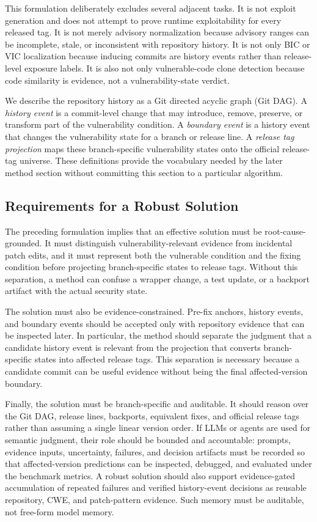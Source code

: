 This formulation deliberately excludes several adjacent tasks. It is not exploit generation and does not attempt to prove runtime exploitability for every released tag. It is not merely advisory normalization because advisory ranges can be incomplete, stale, or inconsistent with repository history. It is not only BIC or VIC localization because inducing commits are history events rather than release-level exposure labels. It is also not only vulnerable-code clone detection because code similarity is evidence, not a vulnerability-state verdict.

We describe the repository history as a Git directed acyclic graph (Git DAG). A \emph{history event} is a commit-level change that may introduce, remove, preserve, or transform part of the vulnerability condition. A \emph{boundary event} is a history event that changes the vulnerability state for a branch or release line. A \emph{release tag projection} maps these branch-specific vulnerability states onto the official release-tag universe. These definitions provide the vocabulary needed by the later method section without committing this section to a particular algorithm.

\subsection{Requirements for a Robust Solution}

The preceding formulation implies that an effective solution must be root-cause-grounded. It must distinguish vulnerability-relevant evidence from incidental patch edits, and it must represent both the vulnerable condition and the fixing condition before projecting branch-specific states to release tags. Without this separation, a method can confuse a wrapper change, a test update, or a backport artifact with the actual security state.

The solution must also be evidence-constrained. Pre-fix anchors, history events, and boundary events should be accepted only with repository evidence that can be inspected later. In particular, the method should separate the judgment that a candidate history event is relevant from the projection that converts branch-specific states into affected release tags. This separation is necessary because a candidate commit can be useful evidence without being the final affected-version boundary.

Finally, the solution must be branch-specific and auditable. It should reason over the Git DAG, release lines, backports, equivalent fixes, and official release tags rather than assuming a single linear version order. If LLMs or agents are used for semantic judgment, their role should be bounded and accountable: prompts, evidence inputs, uncertainty, failures, and decision artifacts must be recorded so that affected-version predictions can be inspected, debugged, and evaluated under the benchmark metrics. A robust solution should also support evidence-gated accumulation of repeated failures and verified history-event decisions as reusable repository, CWE, and patch-pattern evidence. Such memory must be auditable, not free-form model memory.
